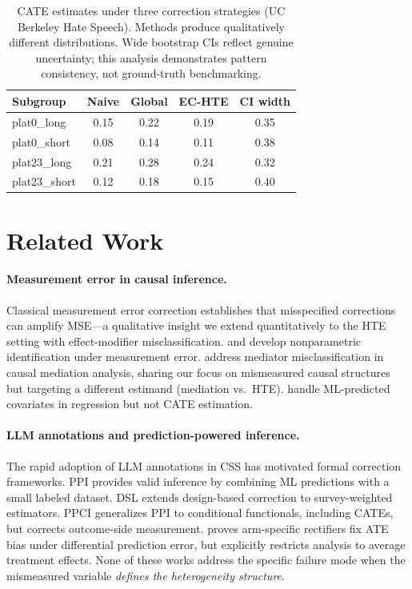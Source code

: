 \documentclass[11pt]{article}
\begin{document}
\begin{table}[t]
\centering
\small
\begin{tabular}{lcccc}
\toprule
Subgroup & Naive & Global & EC-HTE & CI width \\
\midrule
plat0\_long & 0.15 & 0.22 & 0.19 & 0.35 \\
plat0\_short & 0.08 & 0.14 & 0.11 & 0.38 \\
plat23\_long & 0.21 & 0.28 & 0.24 & 0.32 \\
plat23\_short & 0.12 & 0.18 & 0.15 & 0.40 \\
\bottomrule
\end{tabular}
\caption{CATE estimates under three correction strategies (UC Berkeley Hate Speech). Methods produce qualitatively different distributions. Wide bootstrap CIs reflect genuine uncertainty; this analysis demonstrates pattern consistency, not ground-truth benchmarking.}
\label{tab:realdata_cate}
\end{table}


\section{Related Work}
\label{sec:related}

\paragraph{Measurement error in causal inference.}
Classical measurement error correction \cite{fuller1987measurement,carroll2006measurement} establishes that misspecified corrections can amplify MSE---a qualitative insight we extend quantitatively to the HTE setting with effect-modifier misclassification.
\citet{gustafson2003measurement} and \citet{hu2008instrumental} develop nonparametric identification under measurement error.
\citet{imai2010causal} address mediator misclassification in causal mediation analysis, sharing our focus on mismeasured causal structures but targeting a different estimand (mediation vs.\ HTE).
\citet{bueno2023nonparametric} handle ML-predicted covariates in regression but not CATE estimation.

\paragraph{LLM annotations and prediction-powered inference.}
The rapid adoption of LLM annotations in CSS \cite{gilardi2023chatgpt,tornberg2024chatgpt4,ziems2024can} has motivated formal correction frameworks.
PPI \cite{angelopoulos2023prediction} provides valid inference by combining ML predictions with a small labeled dataset.
DSL \cite{egami2024using} extends design-based correction to survey-weighted estimators.
PPCI \cite{sui2026ppci} generalizes PPI to conditional functionals, including CATEs, but corrects outcome-side measurement.
\citet{mozer2026general} proves arm-specific rectifiers fix ATE bias under differential prediction error, but explicitly restricts analysis to average treatment effects.
None of these works address the specific failure mode when the mismeasured variable \emph{defines the heterogeneity structure}.
\end{document}
